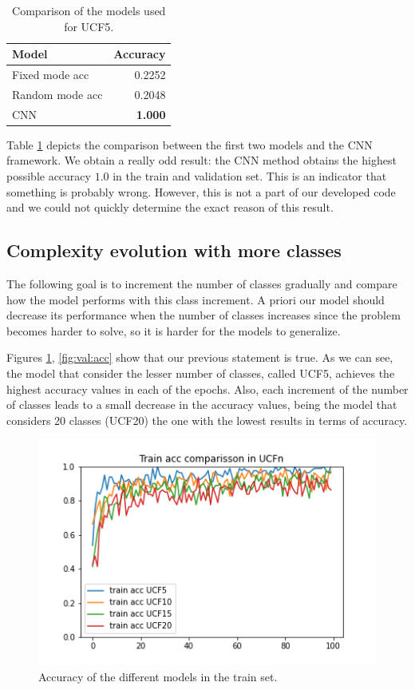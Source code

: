 \documentclass[letterpaper, 10 pt, conference]{ieeeconf}
\begin{document}
\begin{table}[H]
\centering
    \begin{tabular}{lr}
    Model          &    Accuracy    \\ \hline
    Fixed mode acc  & 0.2252  \\
    Random mode acc & 0.2048\\
    CNN &  \textbf{1.000}  \\
    \end{tabular}
    \caption{Comparison of the models used for UCF5.}
    \label{tab:results1:comp}
\end{table}

Table \ref{tab:results1:comp} depicts the comparison between the first two models and the CNN framework. We obtain a really odd result: the CNN method obtains the highest possible accuracy \(1.0\) in the train and validation set. This is an indicator that something is probably wrong. However, this is not a part of our developed code and we could not quickly determine the exact reason of this result.
    
\subsection{Complexity evolution with more classes}

The following goal is to increment the number of classes gradually and compare how the model performs with this class increment. A priori our model should decrease its performance when the number of classes increases since the problem becomes harder to solve, so it is harder for the models to generalize.

Figures \ref{fig:train:acc}, \ref{fig:val:acc} show that our previous statement is true. As we can see, the model that consider the lesser number of classes, called UCF5, achieves the highest accuracy values in each of the epochs. Also, each increment of the number of classes leads to a small decrease in the accuracy values, being the model that considers 20 classes (UCF20) the one with the lowest results in terms of accuracy.

\begin{figure}[]
    \centering
    \includegraphics[scale=0.6]{Figures/UCF_train_acc_comparisson.png}
    \caption{Accuracy of the different models in the train set.}
    \label{fig:train:acc}
\end{figure}
\end{document}
